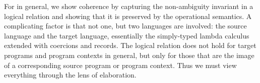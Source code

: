 For \name in general, we show coherence by capturing the non-ambiguity
invariant in a logical relation and showing that it is preserved by the
operational semantics. A complicating factor is that not one, but two languages
are involved: the source language \name and the target language, essentially
the simply-typed lambda calculus extended with coercions and records. The
logical relation does not hold for target programs and program contexts in
general, but only for those that are the image of a corresponding source
program or program context. Thus we must view everything through the lens of
elaboration.

